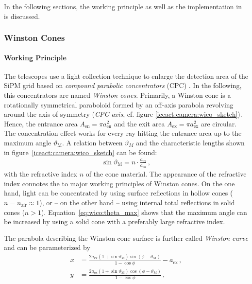
In the following sections, the working principle as well as the implementation in \geant is discussed.

\subsubsection{Winston Cones}\label{sec:winstoncones}

\paragraph{Working Principle}

The \iceact telescopes use a light collection technique to enlarge the detection area of the SiPM grid based on \textit{compound parabolic concentrators} (CPC) \cite{wico:book}. In the following, this concentrators are named \textit{Winston cones}. 
Primarily, a Winston cone is a rotationally symmetrical paraboloid formed by an off-axis parabola revolving around the axis of symmetry (\textit{CPC axis}, cf. figure \ref{iceact:camera:wico_sketch}). Hence, the entrance area $A_\text{en}=\pi a_\text{en}^2$ and the exit area $A_\text{ex}=\pi a_\text{ex}^2$ are circular. The concentration effect works for every ray hitting the entrance area up to the maximum angle $\vartheta_\text{M}$. A relation between $\vartheta_M$ and the characteristic lengths shown in figure~\ref{iceact:camera:wico_sketch} can be found: \cite{wico:book,iceact:camera}
\begin{align}
	\sin\vartheta_\text{M} = n\cdot\frac{a_\text{ex}}{a_\text{en}}\,,
	\label{eq:wico:theta_max}
\end{align}
with the refractive index $n$ of the cone material. The appearance of the refractive index connotes the to major working principles of Winston cones. On the one hand, light can be concentrated by using surface reflections in hollow cones ($n=n_\text{air}\approx 1$), or -- on the other hand -- using internal total reflections in solid cones ($n>1$). Equation~\eqref{eq:wico:theta_max} shows that the maximum angle can be increased by using a solid cone with a preferably large refractive index.

The parabola describing the Winston cone surface is further called \textit{Winston curve} and can be parameterized by \cite{wico:book,iceact:camera}
\begin{subequations}
	\label{eq:wico:param}
	\begin{align}
	x &= \frac{2a_\text{ex}(1+\sin\vartheta_\text{M})\sin(\phi-\vartheta_\text{M})}{1-\cos\phi}-a_\text{ex}\,,\\
	y &= \frac{2a_\text{ex}(1+\sin\vartheta_\text{M})\cos(\phi-\vartheta_\text{M})}{1-\cos\phi}\,,
	\end{align}
\end{subequations}

